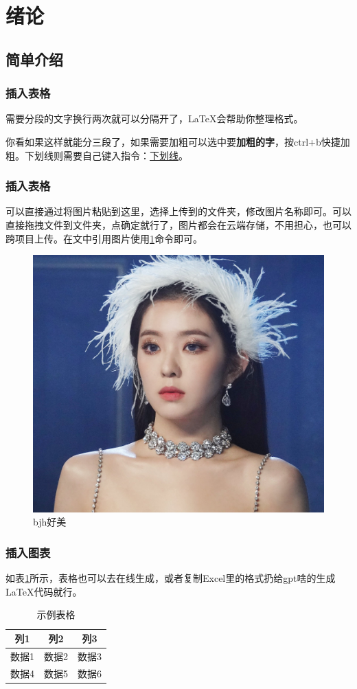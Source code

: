 
\section{绪论}
\subsection{简单介绍}
\subsubsection{插入表格}
需要分段的文字换行两次就可以分隔开了，\LaTeX 会帮助你整理格式。

你看如果这样就能分三段了，如果需要加粗可以选中要\textbf{加粗的字}，按ctrl+b快捷加粗。下划线则需要自己键入指令：\underline{下划线}。

\subsubsection{插入表格}
可以直接通过将图片粘贴到这里，选择上传到的文件夹，修改图片名称即可。可以直接拖拽文件到文件夹，点确定就行了，图片都会在云端存储，不用担心，也可以跨项目上传。在文中引用图片使用\ref{fig:exm}命令即可。
\begin{figure}[h]
    \centering
    \includegraphics[width=0.3\linewidth]{figs/image.png}
    \caption{bjh好美}
    \label{fig:exm}
\end{figure}

\subsubsection{插入图表}如表\ref{tab:example}所示，表格也可以去在线生成，或者复制Excel里的格式扔给gpt啥的生成\LaTeX 代码就行。

\begin{table}[h]
\centering
\caption{示例表格}
\label{tab:example}
\renewcommand{\arraystretch}{1.3} %
\begin{tabular}{ccc}%
\toprule
列1 & 列2 & 列3 \\%
\midrule
数据1 & 数据2 & 数据3 \\
数据4 & 数据5 & 数据6 \\
\bottomrule
\end{tabular}
\end{table}

